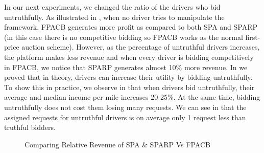 In our next experiments, we changed the ratio of the drivers who bid untruthfully. As illustrated in , when no driver tries to manipulate the framework, FPACB generates more profit as compared to both SPA and SPARP (in this case there is no competitive bidding so FPACB works as the normal first-price auction scheme). However, as the percentage of untruthful drivers increases, the platform makes less revenue and when every driver is bidding competitively in FPACB, we notice that SPARP generates almost 10\% more revenue. In  we proved that in theory, drivers can increase their utility by bidding untruthfully. To show this in practice, we observe in  that when drivers bid untruthfully, their average and median income per mile increases 20-25\%. At the same time, bidding untruthfully does not cost them losing many requests. We can see in  that the assigned requests for untruthful drivers is on average only 1 request less than truthful bidders.

\begin{figure}[h]
    \centering
    \caption{\small{Comparing Relative Revenue of SPA \& SPARP Vs FPACB}}
    \label{fig:cprev}
\end{figure}

